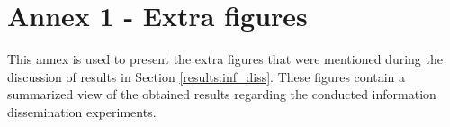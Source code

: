 

\chapter{Annex 1 - Extra figures}
\label{ann:lorem_ipsum1}

This annex is used to present the extra figures that were mentioned during the discussion of results in Section \ref{results:inf_diss}. These figures contain a summarized view of the obtained results regarding the conducted information dissemination experiments.

